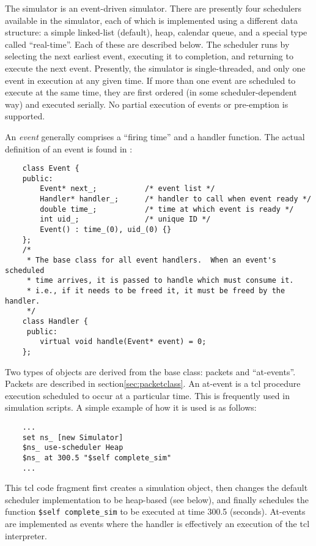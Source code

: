 The simulator is an event-driven simulator.
There are presently four schedulers available in the simulator, each
of which is implemented using a different data structure:
a simple linked-list (default), heap, calendar queue, and a special
type called ``real-time''.  Each of these are described below.
The scheduler runs by selecting the next earliest event, executing
it to completion, and returning to execute the next event.
Presently, the simulator is single-threaded, and only one event
in execution at any given time.
If more than one event are scheduled to execute at the same time,
they are first ordered (in some scheduler-dependent way) and executed
serially.
No partial execution of events or pre-emption is supported.

An {\em event} generally comprises a ``firing time'' and a handler function.
The actual definition of an event is found in :
\begin{small}
\begin{verbatim}
	class Event { 
	public: 
		Event* next_;           /* event list */ 
		Handler* handler_;      /* handler to call when event ready */
		double time_;           /* time at which event is ready */
		int uid_;               /* unique ID */
		Event() : time_(0), uid_(0) {}
	};   
	/*   
	 * The base class for all event handlers.  When an event's scheduled
	 * time arrives, it is passed to handle which must consume it.
	 * i.e., if it needs to be freed it, it must be freed by the handler.
	 */  
	class Handler {
	 public: 
		virtual void handle(Event* event) = 0;
	};   
\end{verbatim}
\end{small}

Two types of objects are derived from the base  class:
packets and ``at-events''.
Packets are described in section\ref{sec:packetclass}.
An at-event is a tcl procedure execution scheduled to occur at
a particular time. 
This is frequently used in simulation scripts.
A simple example of how it is used is as follows:
\begin{small}
\begin{verbatim}
	...
	set ns_ [new Simulator]
	$ns_ use-scheduler Heap
	$ns_ at 300.5 "$self complete_sim"
	...
\end{verbatim}
\end{small}
This tcl code fragment first creates a simulation object,
then changes the default scheduler implementation to be heap-based
(see below), and finally schedules the function {\tt \$self complete\_sim}
to be executed at time 300.5 (seconds).
At-events are implemented as events where the handler is
effectively an execution of the tcl interpreter.


